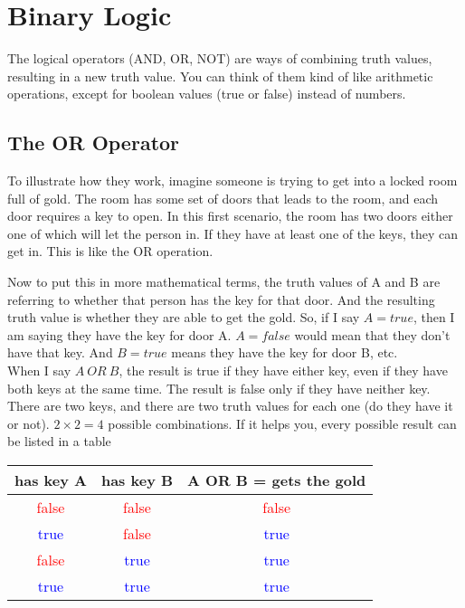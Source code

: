 \chapter{Binary Logic}

The logical operators (AND, OR, NOT) are ways of combining truth values, resulting in a new truth value. You can think of them kind of like arithmetic operations, except for boolean values (true or false) instead of numbers.\\

\section{The OR Operator}

To illustrate how they work, imagine someone is trying to get into a locked room full of gold. The room has some set of doors that leads to the room, and each door requires a key to open. In this first scenario, the room has two doors either one of which will let the person in. If they have at least one of the keys, they can get in. This is like the OR operation.\\

\begin{center} \end{center}

Now to put this in more mathematical terms, the truth values of A and B are referring to whether that person has the key for that door. And the resulting truth value is whether they are able to get the gold. So, if I say \(A=true\), then I am saying they have the key for door A. \(A=false\) would mean that they don't have that key. And \(B=true\) means they have the key for door B, etc.\\

When I say \(A\: OR \: B\), the result is true if they have either key, even if they have both keys at the same time. The result is false only if they have neither key. There are two keys, and there are two truth values for each one (do they have it or not). \(2 \times 2 = 4\) possible combinations. If it helps you, every possible result can be listed in a table\\

\begin{center}
	\begin{tabular}{c | c | c}
		has key A & has key B & A OR B = gets the gold\\ \hline
		\textcolor{red}{false} & \textcolor{red}{false} & \textcolor{red}{false}\\ \hline
		\textcolor{blue}{true} & \textcolor{red}{false} & \textcolor{blue}{true} \\ \hline
		\textcolor{red}{false} & \textcolor{blue}{true} & \textcolor{blue}{true} \\ \hline
		\textcolor{blue}{true} & \textcolor{blue}{true} &\textcolor{blue} {true} \\ \hline
	\end{tabular}
\end{center}

